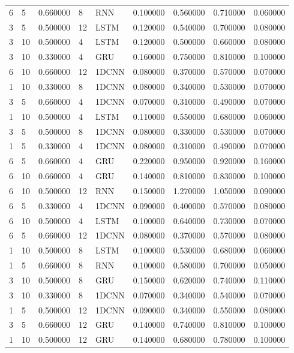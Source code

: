 \begin{tabular}{llrllrrrr}
6 & 5 & 0.660000 & 8 & RNN & 0.100000 & 0.560000 & 0.710000 & 0.060000 \\
3 & 5 & 0.500000 & 12 & LSTM & 0.120000 & 0.540000 & 0.700000 & 0.080000 \\
3 & 10 & 0.500000 & 4 & LSTM & 0.120000 & 0.500000 & 0.660000 & 0.080000 \\
3 & 10 & 0.330000 & 4 & GRU & 0.160000 & 0.750000 & 0.810000 & 0.100000 \\
6 & 10 & 0.660000 & 12 & 1DCNN & 0.080000 & 0.370000 & 0.570000 & 0.070000 \\
1 & 10 & 0.330000 & 8 & 1DCNN & 0.080000 & 0.340000 & 0.530000 & 0.070000 \\
3 & 5 & 0.660000 & 4 & 1DCNN & 0.070000 & 0.310000 & 0.490000 & 0.070000 \\
1 & 10 & 0.500000 & 4 & LSTM & 0.110000 & 0.550000 & 0.680000 & 0.060000 \\
3 & 5 & 0.500000 & 8 & 1DCNN & 0.080000 & 0.330000 & 0.530000 & 0.070000 \\
1 & 5 & 0.330000 & 4 & 1DCNN & 0.080000 & 0.310000 & 0.490000 & 0.070000 \\
6 & 5 & 0.660000 & 4 & GRU & 0.220000 & 0.950000 & 0.920000 & 0.160000 \\
6 & 10 & 0.660000 & 4 & GRU & 0.140000 & 0.810000 & 0.830000 & 0.100000 \\
6 & 10 & 0.500000 & 12 & RNN & 0.150000 & 1.270000 & 1.050000 & 0.090000 \\
6 & 5 & 0.330000 & 4 & 1DCNN & 0.090000 & 0.400000 & 0.570000 & 0.080000 \\
6 & 10 & 0.500000 & 4 & LSTM & 0.100000 & 0.640000 & 0.730000 & 0.070000 \\
6 & 5 & 0.660000 & 12 & 1DCNN & 0.080000 & 0.370000 & 0.570000 & 0.080000 \\
1 & 10 & 0.500000 & 8 & LSTM & 0.100000 & 0.530000 & 0.680000 & 0.060000 \\
1 & 5 & 0.660000 & 8 & RNN & 0.100000 & 0.580000 & 0.700000 & 0.050000 \\
3 & 10 & 0.500000 & 8 & GRU & 0.150000 & 0.620000 & 0.740000 & 0.110000 \\
3 & 10 & 0.330000 & 8 & 1DCNN & 0.070000 & 0.340000 & 0.540000 & 0.070000 \\
1 & 5 & 0.500000 & 12 & 1DCNN & 0.090000 & 0.340000 & 0.550000 & 0.080000 \\
3 & 5 & 0.660000 & 12 & GRU & 0.140000 & 0.740000 & 0.810000 & 0.100000 \\
1 & 10 & 0.500000 & 12 & GRU & 0.140000 & 0.680000 & 0.780000 & 0.100000 \\

\end{tabular}

